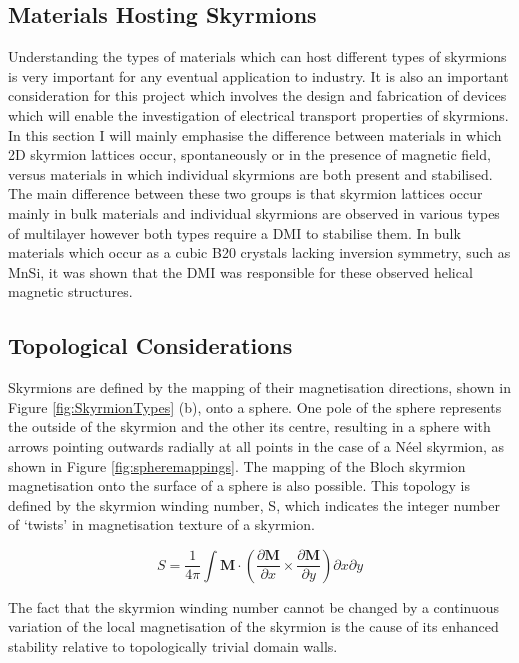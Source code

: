     \subsection{Materials Hosting Skyrmions}\label{subsec:Materials}
    Understanding the types of materials which can host different types of skyrmions is very important for any eventual application to industry. It is also an important consideration for this project which involves the design and fabrication of devices which will enable the investigation of electrical transport properties of skyrmions. In this section I will mainly emphasise the difference between materials in which 2D skyrmion lattices occur, spontaneously or in the presence of magnetic field, versus materials in which individual skyrmions are both present and stabilised. The main difference between these two groups is that skyrmion lattices occur mainly in bulk materials and individual skyrmions are observed in various types of multilayer however both types require a DMI to stabilise them. In bulk materials which occur as a cubic B20 crystals lacking inversion symmetry, such as MnSi, it was shown that the DMI was responsible for these observed helical magnetic structures\cite{Bak1980}.

    \subsection{Topological Considerations}\label{subsec:TopConsiderations}
    Skyrmions are defined by the mapping of their magnetisation directions, shown in Figure \ref{fig:SkyrmionTypes} (b), onto a sphere. One pole of the sphere represents the outside of the skyrmion and the other its centre, resulting in a sphere with arrows pointing outwards radially at all points in the case of a N\'{e}el skyrmion, as shown in Figure \ref{fig:spheremappings}\cite{Everschor-Sitte2014}. The mapping of the Bloch skyrmion magnetisation onto the surface of a sphere is also possible. This topology is defined by the skyrmion winding number, S, which indicates the integer number of `twists' in magnetisation texture of a skyrmion.
	
    \begin{equation}
        S=\frac{1}{4\pi}\int \textbf{M} \cdot \left( \frac{\partial \textbf{M}}{\partial x} \times \frac{\partial \textbf{M}}{\partial y}\right) \partial x \partial y 
    \end{equation}

    The fact that the skyrmion winding number cannot be changed by a continuous variation of the local magnetisation of the skyrmion is the cause of its enhanced stability relative to topologically trivial domain walls.
	 
